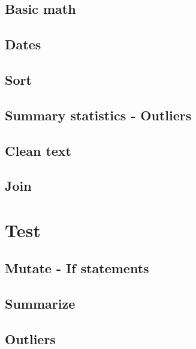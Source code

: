 \documentclass[
]{book}
\begin{document}
\hypertarget{basic-math}{%
\section{Basic math}\label{basic-math}}

\hypertarget{dates}{%
\section{Dates}\label{dates}}

\hypertarget{sort}{%
\section{Sort}\label{sort}}

\hypertarget{summary-statistics---outliers}{%
\section{Summary statistics - Outliers}\label{summary-statistics---outliers}}

\hypertarget{clean-text}{%
\section{Clean text}\label{clean-text}}

\hypertarget{join}{%
\section{Join}\label{join}}

\hypertarget{test}{%
\chapter{Test}\label{test}}

\hypertarget{mutate---if-statements}{%
\section{Mutate - If statements}\label{mutate---if-statements}}

\hypertarget{summarize}{%
\section{Summarize}\label{summarize}}

\hypertarget{outliers}{%
\section{Outliers}\label{outliers}}
\end{document}

